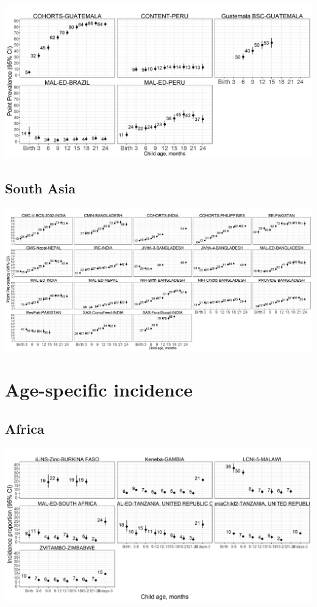 \documentclass[9pt,]{book}
\begin{document}
\includegraphics[width=41.67in]{figure-copies/fig-stunt-2-prev-cohort-latamer-allage-primary}

\hypertarget{south-asia-1}{%
\subsection{South Asia}\label{south-asia-1}}

\includegraphics[width=62.5in]{figure-copies/fig-stunt-2-prev-cohort-asia-allage-primary}

\hypertarget{age-specific-incidence}{%
\section{Age-specific incidence}\label{age-specific-incidence}}

\hypertarget{africa-2}{%
\subsection{Africa}\label{africa-2}}

\includegraphics[width=41.67in]{figure-copies/fig-stunt-2-inc-cohort-africa-allage-primary}
\end{document}
